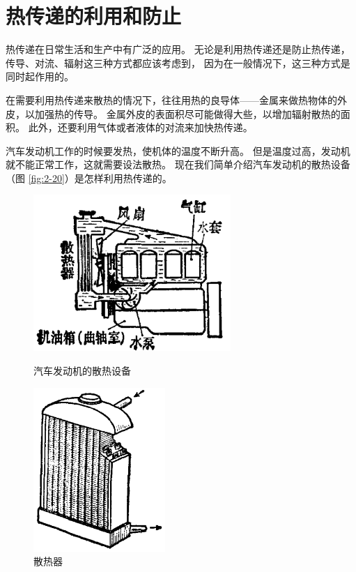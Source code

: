 \section{热传递的利用和防止}\label{sec:2-8}

热传递在日常生活和生产中有广泛的应用。
无论是利用热传递还是防止热传递，传导、对流、辐射这三种方式都应该考虑到，
因为在一般情况下，这三种方式是同时起作用的。

在需要利用热传递来散热的情况下，往往用热的良导体——金属来做热物体的外皮，以加强热的传导。
金属外皮的表面积尽可能做得大些，以增加辐射散热的面积。
此外，还要利用气体或者液体的对流来加快热传递。

汽车发动机工作的时候要发热，使机体的温度不断升高。
但是温度过高，发动机就不能正常工作，这就需要设法散热。
现在我们简单介绍汽车发动机的散热设备（图 \ref{fig:2-20}）是怎样利用热传递的。

\begin{figure}[htbp]
    \centering
    \begin{minipage}{8cm}
    \centering
    \includegraphics[width=7.5cm]{../pic/czwl2-ch2-20}
    \caption{汽车发动机的散热设备}\label{fig:2-20}
    \end{minipage}
    \qquad
    \begin{minipage}{6cm}
    \centering
    \includegraphics[width=5cm]{../pic/czwl2-ch2-21}
    \caption{散热器}\label{fig:2-21}
    \end{minipage}
\end{figure}


